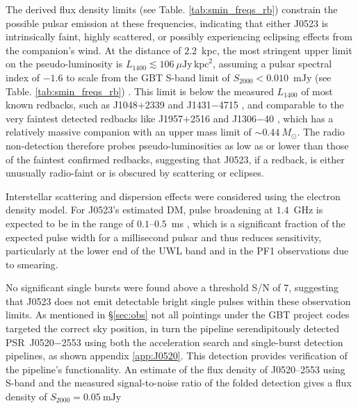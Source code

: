 The derived flux density limits (see Table. \ref{tab:smin_freqs_rb}) constrain the possible pulsar emission at these frequencies, indicating that either J0523 is intrinsically faint, highly scattered, or possibly experiencing eclipsing effects from the companion's wind. At the distance of $2.2$~kpc, the most stringent upper limit on the pseudo-luminosity is $L_{1400} \lesssim 106~\mu\mathrm{Jy\,kpc}^2$, assuming a pulsar spectral index of $-1.6$ to scale from the GBT S-band limit of $S_{2000} < 0.010$~mJy (see Table. \ref{tab:smin_freqs_rb}) \citep[][]{Jankowski2018}. This limit is below the measured $L_{1400}$ of most known redbacks, such as J1048+2339 \citep[$L_{1400} \sim 340~\mu\mathrm{Jy\,kpc}^2$,][]{Deneva2016} and J1431$-$4715 \citep[$L_{1400} \sim 1.8~\mathrm{mJy\,kpc}^2$,][]{Bates2015}, and comparable to the very faintest detected redbacks like J1957+2516 \citep[$L_{1400} \sim 140~\mu\mathrm{Jy\,kpc}^2$,][]{Stovall2016} and J1306$-$40 \citep[$L_{1400} \sim 100$--$200~\mu\mathrm{Jy\,kpc}^2$,][]{keane_survey_2018}, which has a relatively massive companion with an upper mass limit of $\sim 0.44~M_\odot$. The radio non-detection therefore probes pseudo-luminosities as low as or lower than those of the faintest confirmed redbacks, suggesting that J0523, if a redback, is either unusually radio-faint or is obscured by scattering or eclipses.

Interstellar scattering and dispersion effects were considered using the \citet{yao_new_2017} electron density model. For J0523’s estimated DM, pulse broadening at $1.4$~GHz is expected to be in the range of $0.1$--$0.5$~ms \citep{ATNFCat_2005}, which is a significant fraction of the expected pulse width for a millisecond pulsar and thus reduces sensitivity, particularly at the lower end of the UWL band and in the PF1 observations due to smearing.

No significant single bursts were found above a threshold S/N of 7, suggesting that J0523 does not emit detectable bright single pulses within these observation limits. As mentioned in §\ref{sec:obs} not all pointings under the GBT project codes targeted the correct sky position, in turn the pipeline serendipitously detected PSR~J0520$-$2553 using both the acceleration search and single-burst detection pipelines, as shown appendix \ref{app:J0520}. This detection provides verification of the pipeline's functionality. An estimate of the flux density of J0520–2553 using S-band and the measured signal-to-noise ratio of the folded detection gives a flux density of $S_{2000} = 0.05~\text{mJy}$

